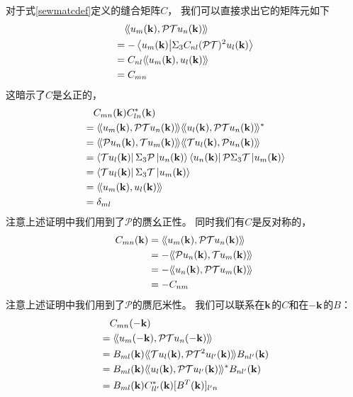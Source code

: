 对于式\eqref{sewmatcdef}定义的缝合矩阵$C$，
我们可以直接求出它的矩阵元如下
\begin{equation}\label{cdefanother}
	\begin{split}
		&\quad \langle\!\langle u_m(\vb k),\mathcal P\mathcal T u_n(\vb k) \rangle\!\rangle\\
		&=-\braket{u_m(\vb k)}{\Sigma_3C_{nl}(\mathcal P\mathcal T)^2u_l(\vb k)}\\
		&= C_{nl}\langle\!\langle u_m(\vb k),u_l(\vb k) \rangle\!\rangle\\
	&=C_{mn}
	\end{split}
\end{equation}
这暗示了$C$是幺正的，
\begin{equation}\label{prfcuni}
	\begin{split}
		&\quad C_{mn}(\vb k)C^*_{ln}(\vb k)\\
		&=\krin{u_m(\vb k),\mathcal P\mathcal T u_n(\vb k)}\krin{u_l(\vb k),\mathcal P\mathcal T u_n(\vb k)}^*\\
		&=\krin{\mathcal P u_n(\vb k),\mathcal T u_m(\vb k)}\krin{\mathcal T u_l(\vb k),\mathcal P u_n(\vb k)}\\
		&=\bra{\mathcal T u_l(\vb k)} \Sigma_3\mathcal P \ket{u_n(\vb k)}\bra{u_n(\vb k)}\mathcal P \Sigma_3 \mathcal T \ket{u_m(\vb k)}\\
		&= \bra{\mathcal T u_l(\vb k)} \Sigma_3 \mathcal T \ket{u_m(\vb k)}\\
		&= \krin{u_m(\vb k),u_l(\vb k)}\\
		&=\delta_{ml}
	\end{split}
\end{equation}
注意上述证明中我们用到了$\mathcal P$的赝幺正性。
同时我们有$C$是反对称的，
\begin{equation}\label{prfcansy}
	\begin{split}
		C_{mn}(\vb k) &=\langle\!\langle u_m(\vb k),\mathcal P\mathcal T u_n(\vb k) \rangle\!\rangle\\
		&= -\langle\!\langle \mathcal P u_n(\vb k),\mathcal T u_m(\vb k) \rangle\!\rangle\\
		&=-\langle\!\langle u_n(\vb k),\mathcal P \mathcal T u_m(\vb k) \rangle\!\rangle\\
		&= -C_{nm}
	\end{split}
\end{equation}
注意上述证明中我们用到了$\mathcal P$的赝厄米性。
我们可以联系在$\vb k$的$C$和在$-\vb k$的$B$：
\begin{equation}
	\begin{split}
		&\quad C_{mn}(-\vb k)\\
		 &=\langle\!\langle u_m(-\vb k),\mathcal P\mathcal T u_n(-\vb k) \rangle\!\rangle\\
		&= B_{ml}(\vb k)\langle\!\langle \mathcal T u_l(\vb k),\mathcal P\mathcal T^2u_{l'}(\vb k) \rangle\!\rangle B_{nl'}(\vb k)\\
		&= B_{ml}(\vb k)\langle\!\langle u_{l}(\vb k),\mathcal P\mathcal T u_{l'}(\vb k) \rangle\!\rangle^*B_{nl'}(\vb k)\\
		&= B_{ml}(\vb k)C_{ll'}^*(\vb k)[B^T(\vb k)]_{l'n}
	\end{split}
\end{equation}
